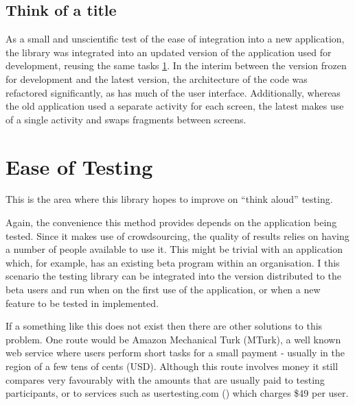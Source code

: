 \subsection{Think of a title}

As a small and unscientific test of the ease of integration into a
new application, the library was integrated into an updated version
of the application used for development, reusing the same tasks
\ref{fig:updated-application}. In the interim between the version
frozen for development and the latest version, the architecture of
the code was refactored significantly, as has much of the user
interface. Additionally, whereas the old application used a separate
activity for each screen, the latest makes use of a single activity
and swaps fragments between screens.


\begin{figure}
  \label{fig:updated-application}
\end{figure}

\section{Ease of Testing}

This is the area where this library hopes to improve on ``think
aloud'' testing.

Again, the convenience this method provides depends on the application
being tested. Since it makes use of crowdsourcing, the quality of
results relies on having a number of people available to use it.
This might be trivial with an application which, for example, has
an existing beta program within an organisation. I this scenario
the testing library can be integrated into the version distributed
to the beta users and run when on the first use of the application,
or when a new feature to be tested in implemented.

If a something like this does not exist then there are other solutions
to this problem. One route would be Amazon Mechanical Turk (MTurk),
a well known web service where users perform short tasks for a small
payment - usually in the region of a few tens of cents (USD).
Although this route involves money it still compares very favourably
with the amounts that are usually paid to testing participants, or
to services such as usertesting.com () which charges \$49 per user.

